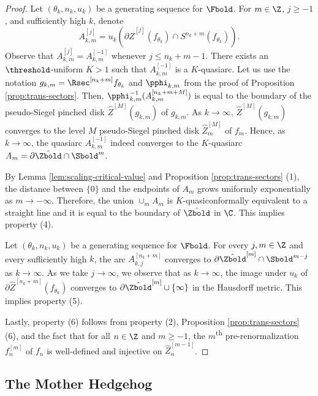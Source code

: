 \documentclass{amsart}
\begin{document}
\begin{proof}
    Let $(\theta_k, n_k, u_k)$ be a generating sequence for $\Fbold$.
    For $m \in \Z$, $j \geq -1$, and sufficiently high $k$, denote
    \[
        A^{[j]}_{k,m} = u_k \left( \partial \hat{Z}^{[j]}(f_{\theta_k}) \cap S^{n_k+m}(f_{\theta_k}) \right).
    \]
    Observe that $A^{[j]}_{k,m} = A^{[-1]}_{k,m}$ whenever $j \leq n_k + m -1$. 
    There exists an $\threshold$-uniform $K > 1$ such that $A^{[-1]}_{k,m}$ is a $K$-quasiarc.
    Let us use the notation $g_{k,m} = \Rsec^{[n_k+m]}f_{\theta_k}$ and $\pphi_{k,m}$ from the proof of Proposition \ref{prop:trans-sectors}.
    Then, $\pphi_{k,m}^{-1}(A^{[n_k + m + M]}_{k,m})$ is equal to the boundary of the pseudo-Siegel pinched disk $\hat{Z}^{[M]}(g_{k,m})$ of $g_{k,m}$.
    As $k \to \infty$, $\hat{Z}^{[M]}(g_{k,m})$ converges to the level $M$ pseudo-Siegel pinched disk $\hat{Z}^{[M]}_m$ of $f_m$.
    Hence, as $k \to \infty$, the quasiarc $A^{[-1]}_{k,m}$ indeed converges to the $K$-quasiarc $A_m = \partial \hat{\Zbold} \cap \Sbold^m$.

    By Lemma \ref{lem:scaling-critical-value} and Proposition \ref{prop:trans-sectors} (1), the distance between $\{0\}$ and the endpoints of $A_m$ grows uniformly exponentially as $m \to -\infty$.
    Therefore, the union $\cup_m A_m$ is $K$-quasiconformally equivalent to a straight line and it is equal to the boundary of $\hat{\Zbold}$ in $\C$.
    This implies property (4).

    Let $(\theta_k, n_k, u_k)$ be a generating sequence for $\Fbold$.
    For every $j, m \in \Z$ and every sufficiently high $k$, the arc $A^{[n_k+m]}_{k,j}$ converges to $\partial \hat{\Zbold}^{[m]} \cap \Sbold^{m-j}$ as $k \to \infty$.
    As we take $j \to \infty$, we observe that as $k \to \infty$, the image under $u_k$ of $\partial \hat{Z}^{[n_k+m]}(f_{\theta_k})$ converges to $\partial \hat{\Zbold}^{[m]} \cup \{\infty\}$ in the Hausdorff metric.
    This implies property (5).

    Lastly, property (6) follows from property (2), Proposition \ref{prop:trans-sectors} (6), and the fact that for all $n \in \Z$ and $m \geq -1$, the $m$\textsuperscript{th} pre-renormalization $f_n^{[m]}$ of $f_n$ is well-defined and injective on $\hat{Z}_n^{[m-1]}$.
\end{proof}

\subsection{The Mother Hedgehog}
\label{ss:MotherHedg:halfplane}
\end{document}

